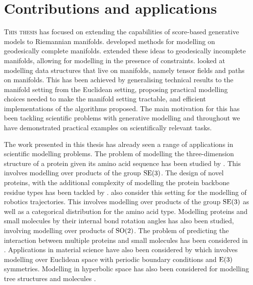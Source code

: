\section{Contributions and applications}
\lettrine{T}{his thesis} has focused on extending the capabilities of score-based generative models to Riemannian manifolds.
 developed methods for modelling on geodesically complete manifolds.  extended these ideas to geodesically incomplete manifolds, allowing for modelling in the presence of constraints.  looked at modelling data structures that live on manifolds, namely tensor fields and paths on manifolds.
This has been achieved by generalising technical results to the manifold setting from the Euclidean setting, proposing practical modelling choices needed to make the manifold setting tractable, and efficient implementations of the algorithms proposed.
The main motivation for this has been tackling scientific problems with generative modelling and throughout we have demonstrated practical examples on scientifically relevant tasks.

The work presented in this thesis has already seen a range of applications in scientific modelling problems.
The problem of modelling the three-dimension structure of a protein given its amino acid sequence has been studied by \textcite{watson2022Broadly, watson2023novo, wang2024protein, yim2023se}.
This involves modelling over products of the group \(\groupSE[3]\).
The design of novel proteins, with the additional complexity of modelling the protein backbone residue types has been tackled by \textcite{anand2022protein, luo2022antigen}.
\textcite{urain2022se} also consider this setting for the modelling of robotics trajectories.
This involves modelling over products of the group \(\groupSE[3]\) as well as a categorical distribution for the amino acid type.
Modelling proteins \cite{wu2024protein} and small molecules
\cite{jing2022torsional} by their internal bond rotation angles has also been studied, involving modelling over products of \(\groupSO[2]\).
The problem of predicting the interaction between multiple proteins and small molecules has been considered in \textcite{corso2023diffdock,ketata2023diffdock}.
Applications in material science have also been considered by \textcite{jiao2024crystal} which involves modelling over Euclidean space with periodic boundary conditions and \(\groupE[3]\) symmetries.
Modelling in hyperbolic space has also been considered for modelling tree structures \cite{wen2024hyperbolic} and molecules \cite{wen2023hyperbolic2023}.



